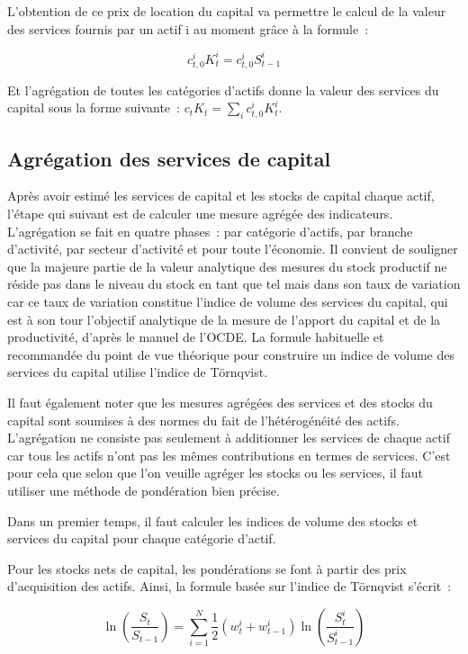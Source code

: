 \documentclass[12pt,a4paper,oneside]{report}
\begin{document}
L’obtention de ce prix de location du capital va permettre le calcul de la valeur des services fournis par un
actif i au moment grâce à la formule~:

\[
{c}_{t,0}^{i}{K}_{t}^{i}={c}_{t,0}^{i}{S}_{t-1}^{i}
\]

Et l’agrégation de toutes les catégories d’actifs donne la valeur des services du capital sous la forme
suivante~: \({c}_{t}{K}_{t}=\sum_{i} {c}_{t,0}^{i}{K}_{t}^{i}\).

\subsection{Agrégation des services de capital}

Après avoir estimé les services de capital et les stocks de capital chaque actif, l’étape qui suivant est de
calculer une mesure agrégée des indicateurs. L’agrégation se fait en quatre phases~: par catégorie d’actifs,
par branche d’activité, par secteur d’activité et pour toute l’économie. Il convient de souligner que la
majeure partie de la valeur analytique des mesures du stock productif ne réside pas dans le niveau du stock en
tant que tel mais dans son taux de variation car ce taux de variation constitue l’indice de volume des
services du capital, qui est à son tour l’objectif analytique de la mesure de l’apport du capital et de la
productivité, d’après le manuel de l’OCDE. La formule habituelle et recommandée du point de vue théorique pour
construire un indice de volume des services du capital utilise l’indice de Törnqvist.

Il faut également noter que les mesures agrégées des services et des stocks du capital sont soumises à des
normes du fait de l’hétérogénéité des actifs. L’agrégation ne consiste pas seulement à additionner les
services de chaque actif car tous les actifs n’ont pas les mêmes contributions en termes de services. C’est
pour cela que selon que l’on veuille agréger les stocks ou les services, il faut utiliser une méthode de
pondération bien précise.

Dans un premier temps, il faut calculer les indices de volume des stocks et services du capital pour chaque
catégorie d’actif.

Pour les stocks nets de capital, les pondérations se font à partir des prix d’acquisition des actifs. Ainsi,
la formule basée sur l’indice de Törnqvist s’écrit~:

\[
\ln \left( \frac{{S}_{t}}{{S}_{t-1}}\right)=\sum_{i=1}^{N} \frac{1}{2}\left( {w}_{t}^{i}+{w}_{t-1}^{i}\right)\ln(\frac{{S}_{t}^{i}}{{S}_{t-1}^{i}})
\]
\end{document}
